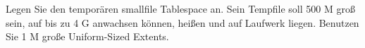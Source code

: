     \item Legen Sie den temporären smallfile Tablespace  an. Sein Tempfile  soll 500 M groß sein, auf bis zu 4 G anwachsen können,  heißen und auf Laufwerk  liegen. Benutzen Sie 1 M große Uniform-Sized Extents.
